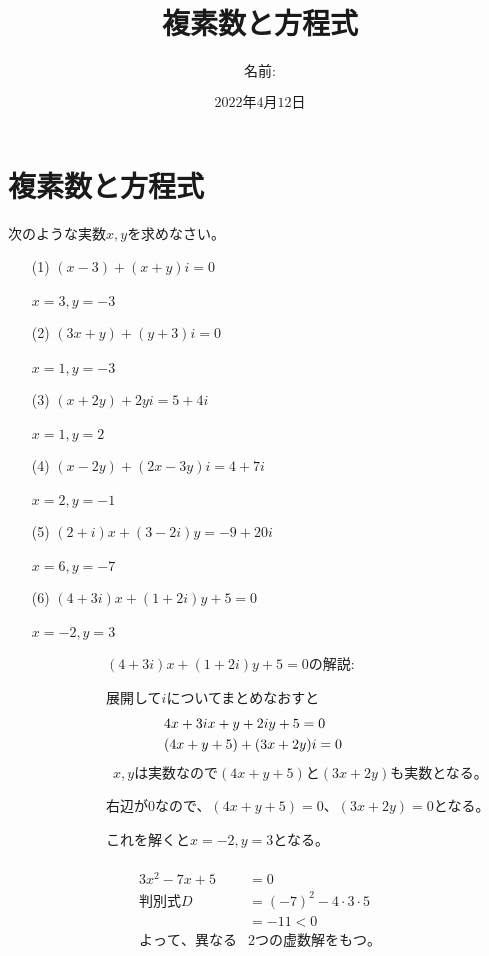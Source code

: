 \documentclass[12pt]{jarticle}
\title{複素数と方程式}
\date{$2022年4月12日$}
\begin{document}
\maketitle
\author{名前:}
\section{複素数と方程式}
次のような実数$x,y$を求めなさい。
\begin{itemize}
  \item[(1)]  $\displaystyle (x -3) + (x + y)i = 0$\\
  \\
  $x = 3,y=-3$
  \\
  \item[(2)] $(3x + y) + (y +3)i = 0$
  \\
  \\
  $x = 1,y=-3$
  \\
  \item[(3)] $(x + 2y) + 2yi = 5 + 4i$
  \\
  \\
  $x = 1,y=2$
  \\
  \item[(4)] $\displaystyle (x - 2y) + (2x - 3y)i = 4 + 7i$
  \\
  \\
  $x = 2,y=-1$
  \\
  \item[(5)] $\displaystyle (2 + i)x+ (3 - 2i)y = -9 + 20i$
  \\
  \\
  $x = 6,y=-7$
  \\
  \item[(6)] $\displaystyle (4 + 3i)x + (1 + 2i)y + 5 = 0$
  \\
  \\
  $x = -2,y=3$
\end{itemize}

\newpage
\ \ \ \ \ \ \ \ \ \ \ \ \ \ $\displaystyle (4 + 3i)x + (1 + 2i)y + 5 = 0$の解説:

\ \ \ \ \ \ \ \ \ \ \ \ \ \ 展開して$i$についてまとめなおすと
\begin{align*}
  \displaystyle
  & 4x + 3ix +y +2iy +5 = 0&\\
  & (4x + y + 5) + (3x + 2y)i = 0&
\end{align*}
\ \ \ \ \ \ \ \ \ \ \ \ \ \ \ $x,y$は実数なので$(4x + y + 5)$と$(3x + 2y)$も実数となる。

\ \ \ \ \ \ \ \ \ \ \ \ \ \ 右辺が$0$なので、$(4x + y + 5)= 0$、$(3x + 2y) = 0$となる。

\ \ \ \ \ \ \ \ \ \ \ \ \ \ これを解くと$x = -2,y = 3$となる。
\\
\\
\begin{align}
  \displaystyle
  3x^2 -7x + 5 &=0\\
  判別式D &= (-7)^2 - 4 \cdot 3 \cdot 5\\
  &= -11 < 0\\
  よって、異なる&2つの虚数解をもつ。
\end{align}
\\
\\
\end{document}
